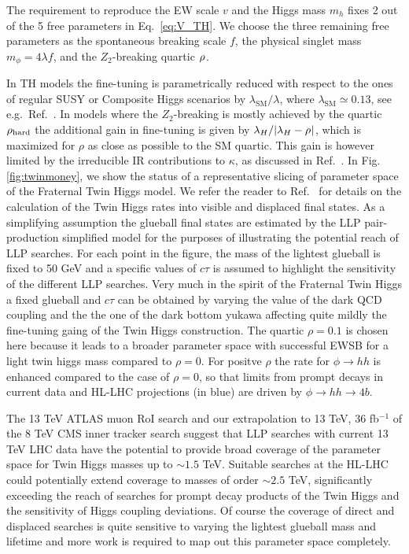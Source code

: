The requirement to reproduce the EW scale $v$ and the Higgs mass $m_h$ fixes 2 out of the 5 free parameters in Eq.~\eqref{eq:V_TH}.
We choose the three remaining free parameters as the spontaneous breaking scale $f$, the physical singlet mass $m_\phi=4\lambda f$, and the $Z_2$-breaking quartic $\rho_{\rm}$.

In TH models the fine-tuning is parametrically reduced with respect to the ones of regular SUSY or Composite Higgs scenarios by $\lambda_{\text{SM}}/\lambda$, where $\lambda_{\text{SM}}\simeq 0.13$, see e.g.\ Ref.~\cite{Katz:2016wtw,Contino:2017moj}. In models where the $Z_2$-breaking is mostly achieved by the quartic $\rho_{\rm hard}$ the additional gain in fine-tuning is given by $\lambda_H/\vert\lambda_H-\rho_{\rm}\vert$, which is maximized for $\rho$ as close as possible to the SM quartic. This gain is however limited by the irreducible IR contributions to $\kappa$, as discussed in Ref.~\cite{Katz:2016wtw}. 
In Fig. \ref{fig:twinmoney}, we show the status of a representative slicing of parameter space of the Fraternal Twin Higgs model. We refer the reader to Ref.~\cite{Alipour-fard:2018mre} for details on the calculation of the Twin Higgs rates into visible and displaced final states. As a simplifying assumption the glueball final states are estimated by the LLP pair-production simplified model for the purposes of illustrating the potential reach of LLP searches. For each point in the figure, the mass of the lightest glueball is fixed to 50 GeV and a specific values of $c \tau$ is assumed to highlight the sensitivity of the different LLP searches. Very much in the spirit of the Fraternal Twin Higgs \cite{Craig:2015pha} a fixed glueball and $c \tau$ can be obtained by varying the value of the dark QCD coupling and the the one of the dark bottom yukawa affecting quite mildly the fine-tuning gaing of the Twin Higgs construction. The quartic $\rho = 0.1$ is chosen here because it leads to a broader parameter space with successful EWSB for a light twin higgs mass compared to $\rho = 0$. For positve $\rho$ the rate for $\phi \rightarrow hh$ is enhanced compared to the case of $\rho = 0$, so that limits from prompt decays in current data and HL-LHC projections (in blue) are driven by $\phi \rightarrow hh \rightarrow 4b$. 

The 13 TeV ATLAS muon RoI search and our extrapolation to 13 TeV, 36 fb$^{-1}$ of the 8 TeV CMS inner tracker search \cite{CMS:2014wda} suggest that LLP searches with current 13 TeV LHC data have the potential to provide broad coverage of the parameter space for Twin Higgs masses up to $\sim 1.5$ TeV. Suitable searches at the HL-LHC could potentially extend coverage to masses of order $\sim 2.5$ TeV, significantly exceeding the reach of searches for prompt decay products of the Twin Higgs and the sensitivity of Higgs coupling deviations. Of course the coverage of direct and displaced searches is quite sensitive to varying the lightest glueball mass and lifetime and more work is required to map out this parameter space completely. 


